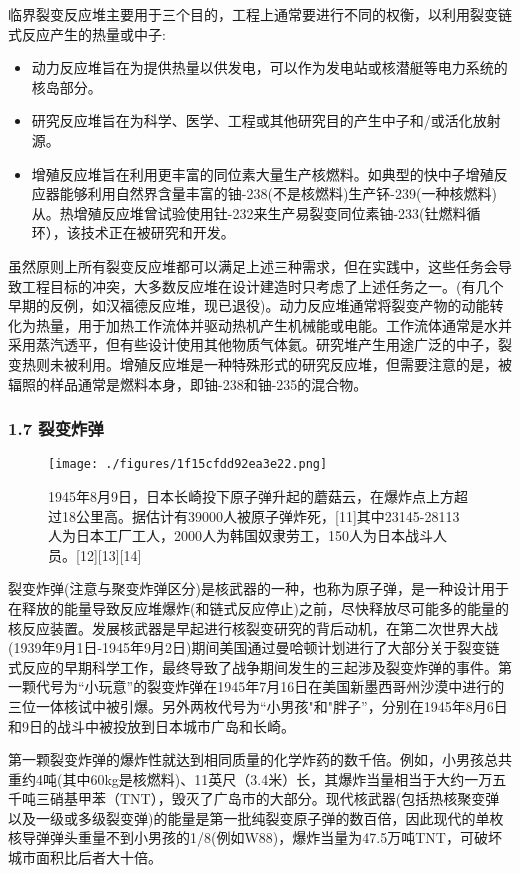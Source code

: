 临界裂变反应堆主要用于三个目的，工程上通常要进行不同的权衡，以利用裂变链式反应产生的热量或中子:
\begin{itemize}
\item 动力反应堆旨在为提供热量以供发电，可以作为发电站或核潜艇等电力系统的核岛部分。
\item 研究反应堆旨在为科学、医学、工程或其他研究目的产生中子和/或活化放射源。
\item 增殖反应堆旨在利用更丰富的同位素大量生产核燃料。如典型的快中子增殖反应器能够利用自然界含量丰富的铀-238(不是核燃料)生产钚-239(一种核燃料)从。热增殖反应堆曾试验使用钍-232来生产易裂变同位素铀-233(钍燃料循环），该技术正在被研究和开发。
\end{itemize}
虽然原则上所有裂变反应堆都可以满足上述三种需求，但在实践中，这些任务会导致工程目标的冲突，大多数反应堆在设计建造时只考虑了上述任务之一。(有几个早期的反例，如汉福德反应堆，现已退役)。动力反应堆通常将裂变产物的动能转化为热量，用于加热工作流体并驱动热机产生机械能或电能。工作流体通常是水并采用蒸汽透平，但有些设计使用其他物质气体氦。研究堆产生用途广泛的中子，裂变热则未被利用。增殖反应堆是一种特殊形式的研究反应堆，但需要注意的是，被辐照的样品通常是燃料本身，即铀-238和铀-235的混合物。

\subsubsection{1.7 裂变炸弹}
\begin{figure}[ht]
\centering
\texttt{[image: ./figures/1f15cfdd92ea3e22.png]}
\caption{1945年8月9日，日本长崎投下原子弹升起的蘑菇云，在爆炸点上方超过18公里高。据估计有39000人被原子弹炸死，[11]其中23145-28113人为日本工厂工人，2000人为韩国奴隶劳工，150人为日本战斗人员。[12][13][14]} \label{fig_HLB_8}
\end{figure}
裂变炸弹(注意与聚变炸弹区分)是核武器的一种，也称为原子弹，是一种设计用于在释放的能量导致反应堆爆炸(和链式反应停止)之前，尽快释放尽可能多的能量的核反应装置。发展核武器是早起进行核裂变研究的背后动机，在第二次世界大战(1939年9月1日-1945年9月2日)期间美国通过曼哈顿计划进行了大部分关于裂变链式反应的早期科学工作，最终导致了战争期间发生的三起涉及裂变炸弹的事件。第一颗代号为“小玩意”的裂变炸弹在1945年7月16日在美国新墨西哥州沙漠中进行的三位一体核试中被引爆。另外两枚代号为“小男孩"和"胖子”，分别在1945年8月6日和9日的战斗中被投放到日本城市广岛和长崎。

第一颗裂变炸弹的爆炸性就达到相同质量的化学炸药的数千倍。例如，小男孩总共重约4吨(其中60kg是核燃料)、11英尺（3.4米）长，其爆炸当量相当于大约一万五千吨三硝基甲苯（TNT），毁灭了广岛市的大部分。现代核武器(包括热核聚变弹以及一级或多级裂变弹)的能量是第一批纯裂变原子弹的数百倍，因此现代的单枚核导弹弹头重量不到小男孩的1/8(例如W88)，爆炸当量为47.5万吨TNT，可破坏城市面积比后者大十倍。

